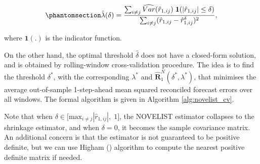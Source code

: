\documentclass[
  11pt,
  letterpaper,
  DIV=11,
  numbers=noendperiod,
  titlepage]{scrartcl}
\begin{document}
\begin{equation}\phantomsection\label{eq-lambda-thr}{
\hat{\lambda}(\delta) = \frac{
  \sum_{i \neq j} \widehat{Var}(\hat{r}_{1,ij}) \; \boldsymbol{1}(|\hat{r}_{1,ij}| \leq \delta)
} {
  \sum_{i \neq j} (\hat{r}_{1,ij} - \hat{r}_{1,ij}^\delta)^2
},
}\end{equation}

where \(\boldsymbol{1}(.)\) is the indicator function.

On the other hand, the optimal threshold \(\hat \delta\) does not have a
closed-form solution, and is obtained by rolling-window cross-validation
procedure. The idea is to find the threshold \(\delta^*\), with the
corresponding \(\lambda^*\) and
\(\hat{\boldsymbol{R}}^{N}_{1}(\delta^*, \lambda^*)\), that minimises
the average out-of-sample 1-step-ahead mean squared reconciled forecast
errors over all windows. The formal algorithm is given in Algorithm
\ref{alg:novelist_cv}.

Note that when
\(\delta \in \bigl[ \text{max}_{i \neq j}|\hat{r}_{1,ij}|, \; 1 \bigr]\),
the NOVELIST estimator collapses to the shrinkage estimator, and when
\(\delta = 0\), it becomes the sample covariance matrix. An additional
concern is that the estimator is not guaranteed to be positive definite,
but we can use Higham () algorithm to
compute the nearest positive definite matrix if needed.
\end{document}
